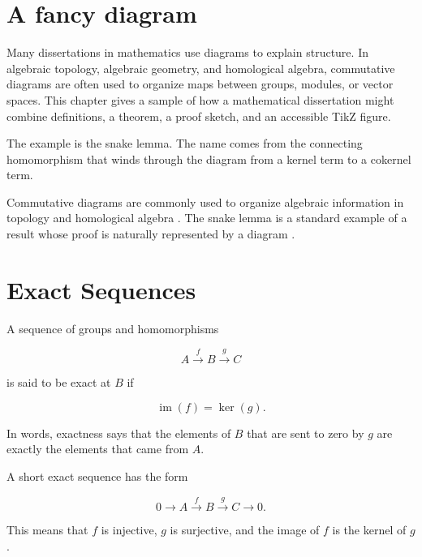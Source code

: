  
\section{A fancy diagram}
\label{sec:chapter-one-fancy-diagram}

Many dissertations in mathematics use diagrams to explain structure. In algebraic topology, algebraic geometry, and homological algebra, commutative diagrams are often used to organize maps between groups, modules, or vector spaces. This chapter gives a sample of how a mathematical dissertation might combine definitions, a theorem, a proof sketch, and an accessible TikZ figure.

The example is the snake lemma. The name comes from the connecting homomorphism that winds through the diagram from a kernel term to a cokernel term.

Commutative diagrams are commonly used to organize algebraic information in topology and homological algebra \citep{sample:diagrammatic-algebra}. The snake lemma is a standard example of a result whose proof is naturally represented by a diagram \citep{sample:snake-lemma}.

\section{Exact Sequences}
\label{sec:exact-sequences}

A sequence of groups and homomorphisms

\begin{equation}
A \xrightarrow{f} B \xrightarrow{g} C
\label{eq:short-sequence}
\end{equation}

is said to be exact at \(B\) if

\begin{equation}
\operatorname{im}(f)=\ker(g).
\label{eq:exact-at-b}
\end{equation}

In words, exactness says that the elements of \(B\) that are sent to zero by \(g\) are exactly the elements that came from \(A\).

A short exact sequence has the form

\begin{equation}
0 \longrightarrow A \xrightarrow{f} B \xrightarrow{g} C \longrightarrow 0.
\label{eq:short-exact-sequence}
\end{equation}

This means that \(f\) is injective, \(g\) is surjective, and the image of \(f\) is the kernel of \(g\).

